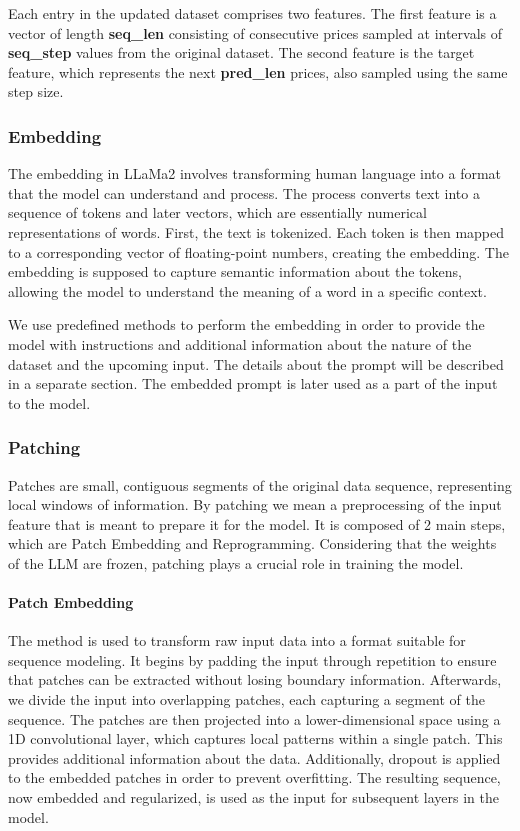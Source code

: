 Each entry in the updated dataset comprises two features. The first feature is a vector of length \textbf{seq\_len} consisting of consecutive prices sampled at intervals of \textbf{seq\_step} values from the original dataset. The second feature is the target feature, which represents the next \textbf{pred\_len} prices, also sampled using the same step size.

\subsubsection*{Embedding}
The embedding in LLaMa2 involves transforming human language into a format that the model can understand and process. The process converts text into a sequence of tokens and later vectors, which are essentially numerical representations of words. First, the text is tokenized. Each token is then mapped to a corresponding vector of floating-point numbers, creating the embedding. The embedding is supposed to capture semantic information about the tokens, allowing the model to understand the meaning of a word in a specific context.  

We use predefined methods to perform the embedding in order to provide the model with instructions and additional information about the nature of the dataset and the upcoming input. The details about the prompt will be described in a separate section. The embedded prompt is later used as a part of the input to the model.

\subsubsection*{Patching}
Patches are small, contiguous segments of the original data sequence, representing local windows of information. By patching we mean a preprocessing of the input feature that is meant to prepare it for the model. It is composed of 2 main steps, which are Patch Embedding and Reprogramming. Considering that the weights of the LLM are frozen, patching plays a crucial role in training the model. 

\paragraph{Patch Embedding}
The method is used to transform raw input data into a format suitable for sequence modeling. It begins by padding the input through repetition to ensure that patches can be extracted without losing boundary information. Afterwards, we divide the input into overlapping patches, each capturing a segment of the sequence. The patches are then projected into a lower-dimensional space using a 1D convolutional layer, which captures local patterns within a single patch. This provides additional information about the data. Additionally, dropout is applied to the embedded patches in order to prevent overfitting. The resulting sequence, now embedded and regularized, is used as the input for subsequent layers in the model.

